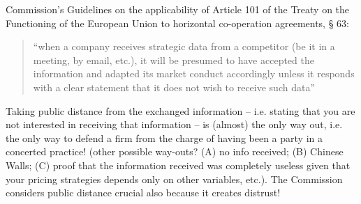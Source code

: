             Commission’s Guidelines on the applicability of Article 101 of the Treaty on the Functioning of the European Union to horizontal co-operation agreements, § 63:

            \begin{quote}
                “when a company receives strategic data from a competitor (be it in a meeting, by email, etc.), it will be presumed to have accepted the information and adapted its market conduct accordingly unless it responds with a clear statement that it does not wish to receive such data”
            \end{quote}


            Taking public distance from the exchanged information – i.e. stating that you are not interested in receiving that information – is (almost) the only way out, i.e. the only way to defend a firm from the charge of having been a party in a concerted practice! (other possible way-outs? (A) no info received; (B) Chinese Walls; (C) proof that the information received was completely useless given that your pricing strategies depends only on other variables, etc.). The Commission considers public distance crucial also because it creates distrust!



